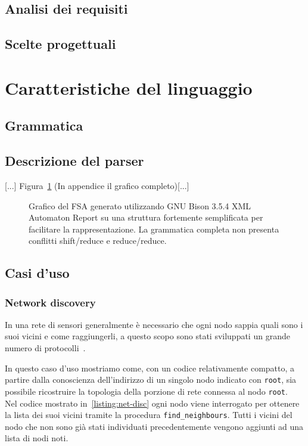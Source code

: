 \documentclass[10pt]{article}
\begin{document}
\subsection{Analisi dei requisiti}
\subsection{Scelte progettuali}
\section{Caratteristiche del linguaggio}\label{section:caratteristiche-linguaggio}
\subsection{Grammatica}
\subsection{Descrizione del parser}
{[...]} Figura~\ref{fig:parser_simple} (In appendice il grafico completo)[...]
\begin{figure}
	\centering
	\caption{Grafico del FSA generato utilizzando  GNU Bison 3.5.4 XML Automaton Report su una struttura fortemente semplificata per facilitare la rappresentazione. La grammatica completa non presenta conflitti shift/reduce e reduce/reduce.}
	\label{fig:parser_simple}
\end{figure}

\subsection{Casi d'uso}\label{subsection:casi-d_uso}
\subsubsection{Network discovery}\label{subsubsection:net-disc}
In una rete di sensori generalmente è necessario che ogni nodo sappia quali sono i suoi vicini e come raggiungerli, a questo scopo sono stati sviluppati un grande numero di protocolli~\cite{narten1998neighbor, kandhalu2010u, alsa2012secure}.

In questo caso d'uso mostriamo come, con un codice relativamente compatto, a partire dalla conoscienza dell'indirizzo di un singolo nodo indicato con \texttt{root}, sia possibile ricostruire la topologia della porzione di rete connessa al nodo \texttt{root}.\\
Nel codice mostrato in~\ref{listing:net-disc} ogni nodo viene interrogato per ottenere la lista dei suoi vicini tramite la procedura \texttt{find\_neighbours}. Tutti i vicini del nodo che non sono già stati individuati precedentemente vengono aggiunti ad una lista di nodi noti.
\end{document}
